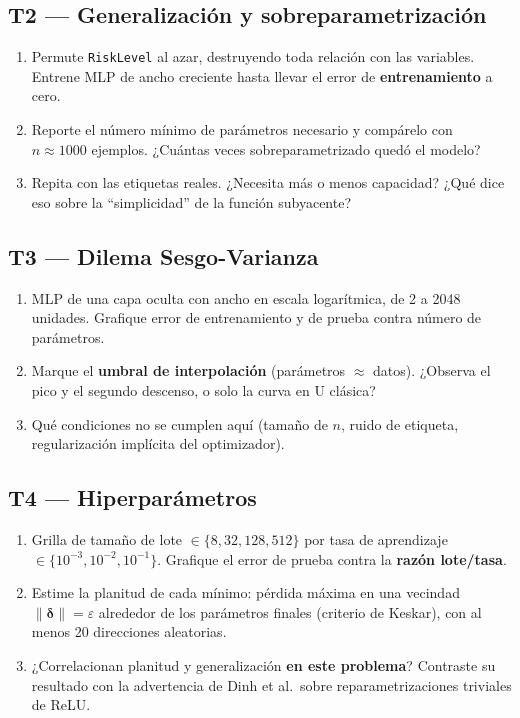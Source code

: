 \documentclass[11pt, a4paper]{article}
\newcommand{\enlace}[1]{\par\vspace{2pt}{\footnotesize\color{StanfordGray}%
	$\hookrightarrow$\  #1}}
\begin{document}
\subsection*{T2 --- Generalización y sobreparametrización}
\begin{enumerate}
	\item Permute \texttt{RiskLevel} al azar, destruyendo toda relaci\'on con las variables. Entrene MLP de ancho creciente hasta llevar el error de \textbf{entrenamiento} a cero.
	\item Reporte el n\'umero m\'inimo de par\'ametros necesario y comp\'arelo con $n \approx 1000$ ejemplos. ¿Cu\'antas veces sobreparametrizado quedó el modelo?
	\item Repita con las etiquetas reales. ¿Necesita m\'as o menos capacidad? ¿Qu\'e dice eso sobre la ``simplicidad'' de la funci\'on subyacente?
\end{enumerate}

\subsection*{T3 --- Dilema Sesgo-Varianza}
\begin{enumerate}
	\item MLP de una capa oculta con ancho en escala logar\'itmica, de 2 a 2048 unidades. Grafique error de entrenamiento y de prueba contra n\'umero de par\'ametros.
	\item Marque el \textbf{umbral de interpolaci\'on} (par\'ametros $\approx$ datos). ¿Observa el pico y el segundo descenso, o solo la curva en U cl\'asica?
	\item Qu\'e condiciones no se cumplen aqu\'i (tama\~no de $n$, ruido de etiqueta, regularizaci\'on impl\'icita del optimizador).
\end{enumerate}

\subsection*{T4 --- Hiperpar\'ametros}
\begin{enumerate}
	\item Grilla de tama\~no de lote $\in \{8, 32, 128, 512\}$ por tasa de aprendizaje $\in \{10^{-3}, 10^{-2}, 10^{-1}\}$. Grafique el error de prueba contra la \textbf{raz\'on lote/tasa}.
	\item Estime la planitud de cada m\'inimo: p\'erdida m\'axima en una vecindad $\lVert\bm\delta\rVert = \varepsilon$ alrededor de los par\'ametros finales (criterio de Keskar), con al menos 20 direcciones aleatorias.
	\item ¿Correlacionan planitud y generalizaci\'on \textbf{en este problema}? Contraste su resultado con la advertencia de Dinh et al.\ sobre reparametrizaciones triviales de ReLU.
\end{enumerate}
\end{document}
